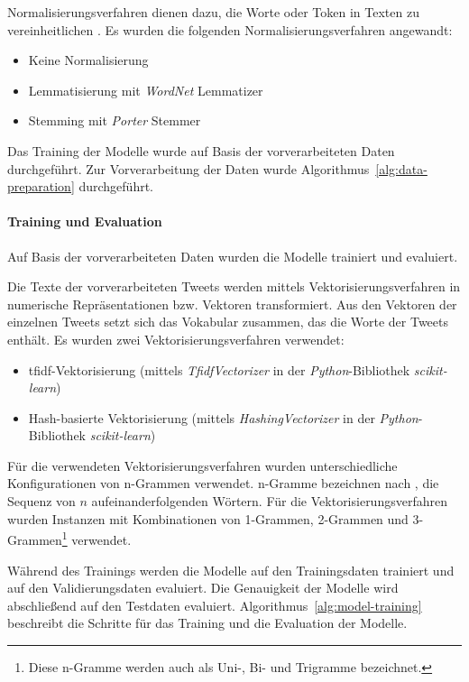 Normalisierungsverfahren dienen dazu, die Worte oder Token in Texten zu vereinheitlichen \cite[S.28]{manning2009introduction}.
Es wurden die folgenden Normalisierungsverfahren angewandt:
\begin{itemize}
    \item Keine Normalisierung
    \item Lemmatisierung mit \textit{WordNet} Lemmatizer
    \item Stemming mit \textit{Porter} Stemmer
\end{itemize}

Das Training der Modelle wurde auf Basis der vorverarbeiteten Daten durchgeführt.
Zur Vorverarbeitung der Daten wurde Algorithmus~\ref{alg:data-preparation} durchgeführt.

\paragraph{Training und Evaluation}
Auf Basis der vorverarbeiteten Daten wurden die Modelle trainiert und evaluiert.

Die Texte der vorverarbeiteten Tweets werden mittels Vektorisierungsverfahren in numerische Repräsentationen bzw. Vektoren transformiert.
Aus den Vektoren der einzelnen Tweets setzt sich das Vokabular zusammen, das die Worte der Tweets enthält.
Es wurden zwei Vektorisierungsverfahren verwendet:
\begin{itemize}
    \item \gls{tfidf}-Vektorisierung (mittels \textit{TfidfVectorizer} in der \textit{Python}-Bibliothek \textit{scikit-learn})
    \item Hash-basierte Vektorisierung (mittels \textit{HashingVectorizer} in der \textit{Python}-Bibliothek \textit{scikit-learn})
\end{itemize}
Für die verwendeten Vektorisierungsverfahren wurden unterschiedliche Konfigurationen von n-Grammen verwendet.
n-Gramme bezeichnen nach \cite[S.33]{jm3}, die Sequenz von $n$ aufeinanderfolgenden Wörtern.
Für die Vektorisierungsverfahren wurden Instanzen mit Kombinationen von 1-Grammen, 2-Grammen und 3-Grammen\footnote{Diese n-Gramme werden auch als Uni-, Bi- und Trigramme bezeichnet.} verwendet.

Während des Trainings werden die Modelle auf den Trainingsdaten trainiert und auf den Validierungsdaten evaluiert.
Die Genauigkeit der Modelle wird abschließend auf den Testdaten evaluiert.
Algorithmus~\ref{alg:model-training} beschreibt die Schritte für das Training und die Evaluation der Modelle.

